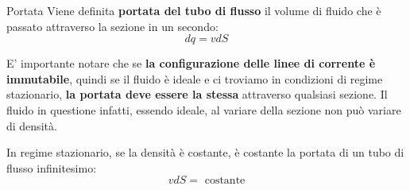 \documentclass[x11names]{article}
\begin{document}
	\begin{center}
		\colorbox{yblue}{\begin{minipage}{5.75in}
				\begin{blues}{Portata}
					Viene definita \textbf{portata del tubo di flusso} il volume di fluido che è passato attraverso la sezione in un secondo:
					\begin{equation}
						dq = v dS
					\end{equation}
				\end{blues}
		\end{minipage}}
	\end{center}
	E' importante notare che se \textbf{la configurazione delle linee di corrente è immutabile}, quindi se il fluido è ideale e ci troviamo in condizioni di regime stazionario, \textbf{la portata deve essere la stessa} attraverso qualsiasi sezione. Il fluido in questione infatti, essendo ideale, al variare della sezione non può variare di densità.
	
	
	
	
	\begin{center}
		\colorbox{yred}{\begin{minipage}{5.75in}
				\begin{redes}{}
					In regime stazionario, se la densità è costante, è costante la portata di un tubo di flusso infinitesimo:
					\[ 
					vdS = \text{ costante}
					\]
				\end{redes}
		\end{minipage}}
	\end{center}
	
	
\end{document}
